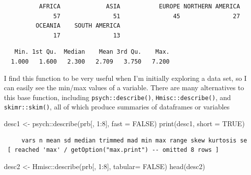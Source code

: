 \documentclass[
  letterpaper,
  DIV=11,
  numbers=noendperiod]{scrreprt}
\newenvironment{Shaded}{\begin{snugshade}}{\end{snugshade}}
\newcommand{\AttributeTok}[1]{\textcolor[rgb]{0.40,0.45,0.13}{#1}}
\newcommand{\ConstantTok}[1]{\textcolor[rgb]{0.56,0.35,0.01}{#1}}
\newcommand{\DecValTok}[1]{\textcolor[rgb]{0.68,0.00,0.00}{#1}}
\newcommand{\FunctionTok}[1]{\textcolor[rgb]{0.28,0.35,0.67}{#1}}
\newcommand{\NormalTok}[1]{\textcolor[rgb]{0.00,0.23,0.31}{#1}}
\newcommand{\OtherTok}[1]{\textcolor[rgb]{0.00,0.23,0.31}{#1}}
\newcommand{\SpecialCharTok}[1]{\textcolor[rgb]{0.37,0.37,0.37}{#1}}
\begin{document}
\begin{verbatim}
          AFRICA             ASIA           EUROPE NORTHERN AMERICA 
              57               51               45               27 
         OCEANIA    SOUTH AMERICA 
              17               13 
\end{verbatim}

\begin{Shaded}
\end{Shaded}

\begin{verbatim}
   Min. 1st Qu.  Median    Mean 3rd Qu.    Max. 
  1.000   1.600   2.300   2.709   3.750   7.200 
\end{verbatim}

I find this function to be very useful when I'm initially exploring a
data set, so I can easily see the min/max values of a variable. There
are many alternatives to this base function, including
\texttt{psych::describe()}, \texttt{Hmisc::describe()}, and
\texttt{skimr::skim()}, all of which produce summaries of dataframes or
variables

\begin{Shaded}
\begin{Highlighting}[]
\NormalTok{desc1  }\OtherTok{\textless{}{-}}\NormalTok{  psych}\SpecialCharTok{::}\FunctionTok{describe}\NormalTok{(prb[, }\DecValTok{1}\SpecialCharTok{:}\DecValTok{8}\NormalTok{],}
                           \AttributeTok{fast =} \ConstantTok{FALSE}\NormalTok{)}
\FunctionTok{print}\NormalTok{(desc1,}
      \AttributeTok{short =} \ConstantTok{TRUE}\NormalTok{)}
\end{Highlighting}
\end{Shaded}

\begin{verbatim}
     vars n mean sd median trimmed mad min max range skew kurtosis se
 [ reached 'max' / getOption("max.print") -- omitted 8 rows ]
\end{verbatim}

\begin{Shaded}
\begin{Highlighting}[]
\NormalTok{desc2 }\OtherTok{\textless{}{-}}\NormalTok{  Hmisc}\SpecialCharTok{::}\FunctionTok{describe}\NormalTok{(prb[, }\DecValTok{1}\SpecialCharTok{:}\DecValTok{8}\NormalTok{],}
                          \AttributeTok{tabular=} \ConstantTok{FALSE}\NormalTok{)}
\FunctionTok{head}\NormalTok{(desc2)}
\end{Highlighting}
\end{Shaded}
\end{document}
